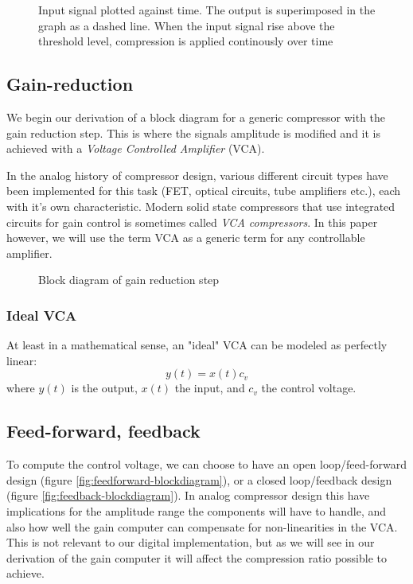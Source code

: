\documentclass[]{article}
\begin{document}
\begin{figure}[ht]
\centering

\caption{Input signal plotted against time. The output is superimposed in the graph as a dashed line. When the input signal rise above the threshold level, compression is applied continously over time } 
\label{fig:envelope-graph}
\end{figure}


\subsection{Gain-reduction}
We begin our derivation of a block diagram for a generic compressor with the gain reduction step. This is where the signals amplitude is modified and it is achieved with a \emph{Voltage Controlled Amplifier} (VCA).

In the analog history of compressor design, various different circuit types have been implemented for this task (FET, optical circuits, tube amplifiers etc.), each with it's own characteristic. Modern solid state compressors that use integrated circuits for gain control is sometimes called \emph{VCA compressors}. In this paper however, we will use the term VCA as a generic term for any controllable amplifier.

\begin{figure}[ht]
\centering

\caption{Block diagram of gain reduction step} 
\label{fig:vca-generic-blockdiagram}
\end{figure}

\subsubsection{Ideal VCA}
At least in a mathematical sense, an "ideal" VCA can be modeled as perfectly linear:
\begin{equation}
	y(t) = x(t) c_v
\end{equation}
where $y(t)$ is the output, $x(t)$ the input, and $c_v$ the control voltage.

\subsection{Feed-forward, feedback}
To compute the control voltage, we can choose to have an open loop/feed-forward design (figure \ref{fig:feedforward-blockdiagram}), or a closed loop/feedback design (figure \ref{fig:feedback-blockdiagram}). In analog compressor design this have implications for the amplitude range the components will have to handle, and also how well the gain computer can compensate for non-linearities in the VCA. This is not relevant to our digital implementation, but as we will see in our derivation of the gain computer it will affect the compression ratio possible to achieve.
\end{document}

